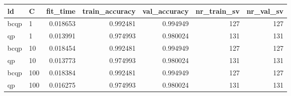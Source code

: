 \begin{tabular}{llrrrrr}
\toprule
  ld &   C &  fit\_time &  train\_accuracy &  val\_accuracy &  nr\_train\_sv &  nr\_val\_sv \\
\midrule
bcqp &   1 &  0.018653 &        0.992481 &      0.994949 &          127 &        127 \\
  qp &   1 &  0.013991 &        0.974993 &      0.980024 &          131 &        131 \\
bcqp &  10 &  0.018454 &        0.992481 &      0.994949 &          127 &        127 \\
  qp &  10 &  0.013773 &        0.974993 &      0.980024 &          131 &        131 \\
bcqp & 100 &  0.018384 &        0.992481 &      0.994949 &          127 &        127 \\
  qp & 100 &  0.016275 &        0.974993 &      0.980024 &          131 &        131 \\
\bottomrule
\end{tabular}
